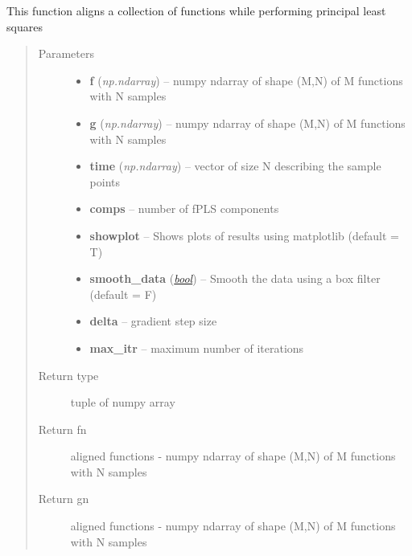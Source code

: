 \documentclass[letterpaper,10pt,english]{sphinxmanual}
\begin{document}
\begin{fulllineitems}
\label{time_warping:time_warping.align_fPLS}
This function aligns a collection of functions while performing principal least squares
\begin{quote}\begin{description}
\item[{Parameters}] \leavevmode\begin{itemize}
\item {} 
\textbf{f} (\emph{np.ndarray}) -- numpy ndarray of shape (M,N) of M functions with N samples

\item {} 
\textbf{g} (\emph{np.ndarray}) -- numpy ndarray of shape (M,N) of M functions with N samples

\item {} 
\textbf{time} (\emph{np.ndarray}) -- vector of size N describing the sample points

\item {} 
\textbf{comps} -- number of fPLS components

\item {} 
\textbf{showplot} -- Shows plots of results using matplotlib (default = T)

\item {} 
\textbf{smooth\_data} (\href{http://docs.python.org/library/functions.html\#bool}{\emph{bool}}) -- Smooth the data using a box filter (default = F)

\item {} 
\textbf{delta} -- gradient step size

\item {} 
\textbf{max\_itr} -- maximum number of iterations

\end{itemize}

\item[{Return type}] \leavevmode
tuple of numpy array

\item[{Return fn}] \leavevmode
aligned functions - numpy ndarray of shape (M,N) of M functions with N samples

\item[{Return gn}] \leavevmode
aligned functions - numpy ndarray of shape (M,N) of M functions with N samples


\end{description}
\end{quote}
\end{fulllineitems}
\end{document}

